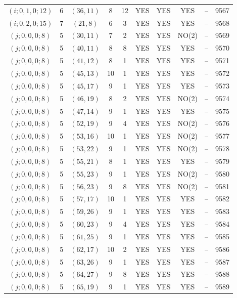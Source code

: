 \begin{longtable}{|c|c|c|c|c|c|c|c|c|c|}
$(i; 0, 1, 0; 12)$ & 6 & $(36, 11)$ & 8 & 12 & YES & YES & YES & -- & 9567\\
$(i; 0, 2, 0; 15)$ & 7 & $(21, 8)$ & 6 & 3 & YES & YES & YES & -- & 9568\\
$(j; 0, 0, 0; 8)$ & 5 & $(30, 11)$ & 7 & 2 & YES & YES & NO(2) & -- & 9569\\
$(j; 0, 0, 0; 8)$ & 5 & $(40, 11)$ & 8 & 8 & YES & YES & YES & -- & 9570\\
$(j; 0, 0, 0; 8)$ & 5 & $(41, 12)$ & 8 & 1 & YES & YES & YES & -- & 9571\\
$(j; 0, 0, 0; 8)$ & 5 & $(45, 13)$ & 10 & 1 & YES & YES & YES & -- & 9572\\
$(j; 0, 0, 0; 8)$ & 5 & $(45, 17)$ & 9 & 1 & YES & YES & YES & -- & 9573\\
$(j; 0, 0, 0; 8)$ & 5 & $(46, 19)$ & 8 & 2 & YES & YES & NO(2) & -- & 9574\\
$(j; 0, 0, 0; 8)$ & 5 & $(47, 14)$ & 9 & 1 & YES & YES & YES & -- & 9575\\
$(j; 0, 0, 0; 8)$ & 5 & $(52, 19)$ & 9 & 4 & YES & YES & NO(2) & -- & 9576\\
$(j; 0, 0, 0; 8)$ & 5 & $(53, 16)$ & 10 & 1 & YES & YES & NO(2) & -- & 9577\\
$(j; 0, 0, 0; 8)$ & 5 & $(53, 22)$ & 9 & 1 & YES & YES & NO(2) & -- & 9578\\
$(j; 0, 0, 0; 8)$ & 5 & $(55, 21)$ & 8 & 1 & YES & YES & YES & -- & 9579\\
$(j; 0, 0, 0; 8)$ & 5 & $(55, 23)$ & 9 & 1 & YES & YES & NO(2) & -- & 9580\\
$(j; 0, 0, 0; 8)$ & 5 & $(56, 23)$ & 9 & 8 & YES & YES & NO(2) & -- & 9581\\
$(j; 0, 0, 0; 8)$ & 5 & $(57, 17)$ & 10 & 1 & YES & YES & YES & -- & 9582\\
$(j; 0, 0, 0; 8)$ & 5 & $(59, 26)$ & 9 & 1 & YES & YES & YES & -- & 9583\\
$(j; 0, 0, 0; 8)$ & 5 & $(60, 23)$ & 9 & 4 & YES & YES & YES & -- & 9584\\
$(j; 0, 0, 0; 8)$ & 5 & $(61, 25)$ & 9 & 1 & YES & YES & YES & -- & 9585\\
$(j; 0, 0, 0; 8)$ & 5 & $(62, 17)$ & 10 & 2 & YES & YES & YES & -- & 9586\\
$(j; 0, 0, 0; 8)$ & 5 & $(63, 26)$ & 9 & 1 & YES & YES & YES & -- & 9587\\
$(j; 0, 0, 0; 8)$ & 5 & $(64, 27)$ & 9 & 8 & YES & YES & YES & -- & 9588\\
$(j; 0, 0, 0; 8)$ & 5 & $(65, 19)$ & 9 & 1 & YES & YES & YES & -- & 9589\\

\end{longtable}
